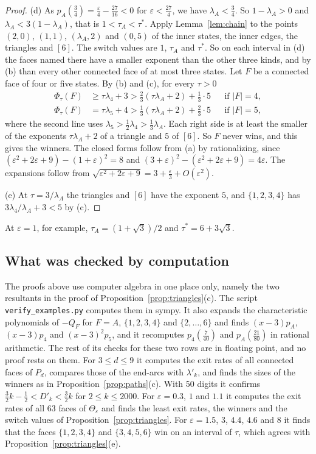 \begin{proof}
(d) As $p_A(\frac34)=\frac\varepsilon4-\frac{27}{16}<0$ for
$\varepsilon<\frac{27}4$, we have $\lambda_A<\frac34$. So $1-\lambda_A>0$ and
$\lambda_A<3(1-\lambda_A)$, that is $1<\tau_A<\tau^*$. Apply
Lemma~\ref{lem:chain} to the points $(2,0)$, $(1,1)$, $(\lambda_A,2)$ and
$(0,5)$ of the inner states, the inner edges, the triangles and $[6]$. The
switch values are $1$, $\tau_A$ and $\tau^*$. So on each interval in (d) the
faces named there have a smaller exponent than the other three kinds, and by (b)
than every other connected face of at most three states. Let $F$ be a
connected face of four or five states. By (b) and (c), for every $\tau>0$
\begin{align*}
 \Phi_\tau(F)&\ge\tau\lambda_4+3>\tfrac23(\tau\lambda_A+2)+\tfrac13\cdot5
 &&\text{if }\lvert F\rvert=4,\\
 \Phi_\tau(F)&=\tau\lambda_5+4>\tfrac13(\tau\lambda_A+2)+\tfrac23\cdot5
 &&\text{if }\lvert F\rvert=5,
\end{align*}
where the second line uses $\lambda_5>\frac12\lambda_4>\frac13\lambda_A$. Each
right side is at least the smaller of the exponents $\tau\lambda_A+2$ of a
triangle and $5$ of $[6]$. So $F$ never wins, and this gives the winners. The closed forms follow from (a) by rationalizing, since
$(\varepsilon^2+2\varepsilon+9)-(1+\varepsilon)^2=8$ and
$(3+\varepsilon)^2-(\varepsilon^2+2\varepsilon+9)=4\varepsilon$. The
expansions follow from
$\sqrt{\varepsilon^2+2\varepsilon+9}=3+\frac\varepsilon3+O(\varepsilon^2)$.

(e) At $\tau=3/\lambda_A$ the triangles and $[6]$ have the exponent $5$, and
$\{1,2,3,4\}$ has $3\lambda_4/\lambda_A+3<5$ by (c).
\end{proof}

At $\varepsilon=1$, for example, $\tau_A=(1+\sqrt3)/2$ and
$\tau^*=6+3\sqrt3$.

\subsection{What was checked by computation}\label{app:examples-checks}

The proofs above use computer algebra in one place only, namely the two
resultants in the proof of Proposition~\ref{prop:triangles}(c). The script
\texttt{verify\_examples.py} computes them in sympy. It also expands the
characteristic polynomials of $-Q_F$ for $F=A$, $\{1,2,3,4\}$ and
$\{2,\dots,6\}$ and finds $(x-3)p_A$, $(x-3)p_4$ and $(x-3)^2p_5$, and it
recomputes $p_4(\frac7{40})$ and $p_A(\frac{21}{80})$ in rational arithmetic.
The rest of its checks for these two rows are in floating point, and no proof
rests on them. For $3\le d\le9$ it computes the exit rates of all connected
faces of $P_d$, compares those of the end-arcs with $\lambda'_k$, and finds
the sizes of the winners as in Proposition~\ref{prop:paths}(c). With 50
digits it confirms $\frac32k-\frac12<D'_k<\frac32k$ for $2\le k\le2000$. For
$\varepsilon=0.3$, $1$ and $1.1$ it computes the exit rates of all 63 faces of
$\Theta_\varepsilon$ and finds the least exit rates, the winners and the
switch values of Proposition~\ref{prop:triangles}. For $\varepsilon=1.5$, $3$,
$4.4$, $4.6$ and $8$ it finds that the faces $\{1,2,3,4\}$ and $\{3,4,5,6\}$
win on an interval of $\tau$, which agrees with
Proposition~\ref{prop:triangles}(e).

